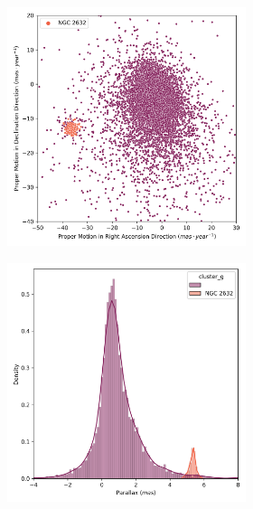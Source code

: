 \documentclass[11pt, a4paper, english]{book}
\begin{document}
\begin{figure}[H]
  \vfil
  \centering
  \begin{subfigure}{0.9\textwidth}
    \centering
    \begin{subfigure}[t]{0.30\textwidth}
      \centering
      \includegraphics[width=\textwidth]{../figures/ngc_2632/pm_ngc_2632.png}
    \end{subfigure}
    \hfill
    \begin{subfigure}[t]{0.30\textwidth}
      \centering
      \includegraphics[width=\textwidth]{../figures/ngc_2632/parallax_ngc_2632.png}

\end{subfigure}
\end{subfigure}
\end{figure}
\end{document}
